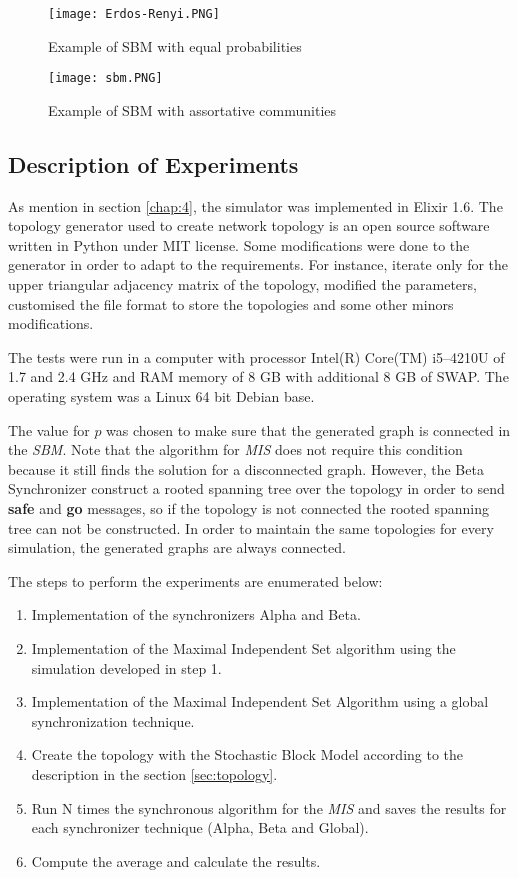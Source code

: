 \begin{figure}[ht]
\centering
\texttt{[image: Erdos-Renyi.PNG]} 
\caption{Example of SBM with equal probabilities}
\label{fig:erdos}
\end{figure}

\begin{figure}[ht]
\centering
\texttt{[image: sbm.PNG]} 
\caption{Example of SBM with assortative communities}
\label{fig:sbm}
\end{figure}

\subsection{Description of Experiments}

As mention in section \ref{chap:4}, the simulator was implemented in Elixir 1.6. The topology generator used to create network topology is an open source software written in Python under MIT license. Some modifications were done to the generator in order to adapt to the requirements. For instance, iterate only for the upper triangular adjacency matrix of the topology, modified the parameters, customised the file format to store the topologies and some other minors modifications. 

The tests were run in a computer with processor Intel(R) Core(TM) i5--4210U of 1.7 and 2.4 GHz and RAM memory of 8 GB with additional 8 GB of SWAP. The operating system was a Linux 64 bit Debian base.


The value for $p$ was chosen to make sure that the generated graph is connected in the \textit{SBM}. Note that the algorithm for \textit{MIS} does not require this condition because it still finds the solution for a disconnected graph. However, the Beta Synchronizer construct a rooted spanning tree over the topology in order to send \textbf{safe} and \textbf{go} messages, so if the topology is not connected the rooted spanning tree can not be constructed. In order to maintain the same topologies for every simulation, the generated graphs are always connected.  

The steps to perform the experiments are enumerated below:

\begin{enumerate}
\item Implementation of the synchronizers Alpha and Beta.
\item Implementation of the Maximal Independent Set algorithm using the simulation developed in step 1.
\item Implementation of the Maximal Independent Set Algorithm using a global synchronization technique.
\item Create the topology with the Stochastic Block Model according to the description in the section \ref{sec:topology}.
\item Run N times the synchronous algorithm for the \textit{MIS} and saves the results for each synchronizer technique (Alpha, Beta and Global).
\item Compute the average and calculate the results.
\end{enumerate}



